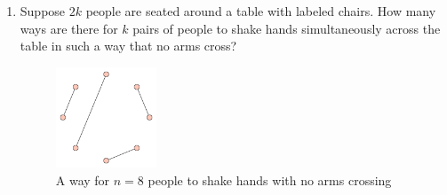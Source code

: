 \documentclass[11pt]{article}
\begin{document}
\begin{enumerate}
{\bf Example}: When there are $5$ votes, N gets $3$ and A gets $2$.  Here is one possible way for the ballots to be read out where Nathan is always ahead: NNANA.  The reading NNAAN does not count, because after four votes are read the candidates are tied.

\vspace{.5 cm}

\item Suppose $2k$ people are seated around a table with labeled chairs.  How many ways are there for $k$ pairs of people to shake hands simultaneously across the table in such a way that no arms cross?

\begin{figure}[h]
\centering
\includegraphics[width=30mm]{oct.png}
\caption{A way for $n = 8$ people to shake hands with no arms crossing}
\end{figure}







\end{enumerate}
\end{document}
